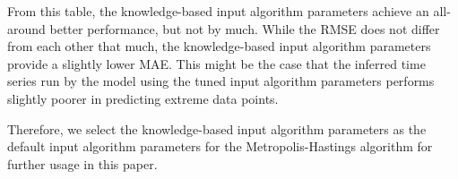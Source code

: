 From this table, the knowledge-based input algorithm parameters achieve an all-around better performance, but not by much. While the RMSE does not differ from each other that much, the knowledge-based input algorithm parameters provide a slightly lower MAE. This might be the case that the inferred time series run by the model using the tuned input algorithm parameters performs slightly poorer in predicting extreme data points.

Therefore, we select the knowledge-based input algorithm parameters as the default input algorithm parameters for the Metropolis-Hastings algorithm for further usage in this paper.



